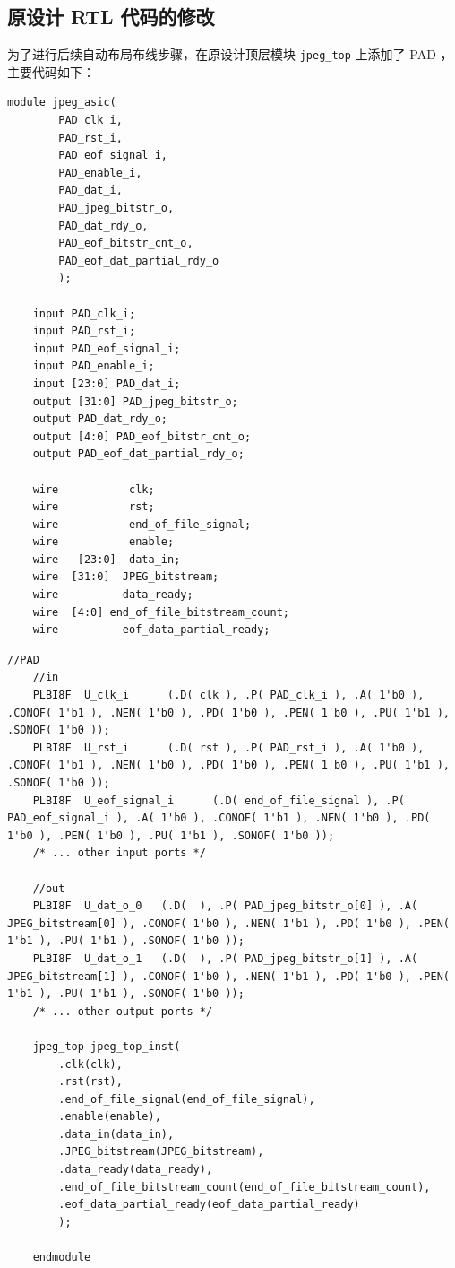 \documentclass[12pt,hyperref,a4paper,UTF8]{ctexart}
\begin{document}
\subsection{原设计 RTL 代码的修改}
为了进行后续自动布局布线步骤，在原设计顶层模块 \texttt{jpeg\_top} 上添加了 PAD ，
主要代码如下：
\begin{lstlisting}[style=Verilogstyle,name=jpeg_asic]
    module jpeg_asic(
        PAD_clk_i, 
        PAD_rst_i, 
        PAD_eof_signal_i, 
        PAD_enable_i, 
        PAD_dat_i, 
        PAD_jpeg_bitstr_o, 
        PAD_dat_rdy_o, 
        PAD_eof_bitstr_cnt_o, 
        PAD_eof_dat_partial_rdy_o
        );
    
    input PAD_clk_i;
    input PAD_rst_i;
    input PAD_eof_signal_i;
    input PAD_enable_i;
    input [23:0] PAD_dat_i;
    output [31:0] PAD_jpeg_bitstr_o;
    output PAD_dat_rdy_o;
    output [4:0] PAD_eof_bitstr_cnt_o;
    output PAD_eof_dat_partial_rdy_o;
    
    wire           clk;
    wire           rst;
    wire           end_of_file_signal;
    wire           enable;
    wire   [23:0]  data_in;
    wire  [31:0]  JPEG_bitstream;
    wire          data_ready;
    wire  [4:0] end_of_file_bitstream_count;
    wire          eof_data_partial_ready;
\end{lstlisting}
\newpage
\begin{lstlisting}[style=Verilogstyle,name=jpeg_asic]
    //PAD
    //in
    PLBI8F  U_clk_i      (.D( clk ), .P( PAD_clk_i ), .A( 1'b0 ), .CONOF( 1'b1 ), .NEN( 1'b0 ), .PD( 1'b0 ), .PEN( 1'b0 ), .PU( 1'b1 ), .SONOF( 1'b0 ));
    PLBI8F  U_rst_i      (.D( rst ), .P( PAD_rst_i ), .A( 1'b0 ), .CONOF( 1'b1 ), .NEN( 1'b0 ), .PD( 1'b0 ), .PEN( 1'b0 ), .PU( 1'b1 ), .SONOF( 1'b0 ));
    PLBI8F  U_eof_signal_i      (.D( end_of_file_signal ), .P( PAD_eof_signal_i ), .A( 1'b0 ), .CONOF( 1'b1 ), .NEN( 1'b0 ), .PD( 1'b0 ), .PEN( 1'b0 ), .PU( 1'b1 ), .SONOF( 1'b0 ));
    /* ... other input ports */

    //out
    PLBI8F	U_dat_o_0	(.D(  ), .P( PAD_jpeg_bitstr_o[0] ), .A( JPEG_bitstream[0] ), .CONOF( 1'b0 ), .NEN( 1'b1 ), .PD( 1'b0 ), .PEN( 1'b1 ), .PU( 1'b1 ), .SONOF( 1'b0 )); 
    PLBI8F	U_dat_o_1	(.D(  ), .P( PAD_jpeg_bitstr_o[1] ), .A( JPEG_bitstream[1] ), .CONOF( 1'b0 ), .NEN( 1'b1 ), .PD( 1'b0 ), .PEN( 1'b1 ), .PU( 1'b1 ), .SONOF( 1'b0 )); 
    /* ... other output ports */
    
    jpeg_top jpeg_top_inst(
        .clk(clk), 
        .rst(rst), 
        .end_of_file_signal(end_of_file_signal), 
        .enable(enable), 
        .data_in(data_in), 
        .JPEG_bitstream(JPEG_bitstream),
        .data_ready(data_ready), 
        .end_of_file_bitstream_count(end_of_file_bitstream_count), 
        .eof_data_partial_ready(eof_data_partial_ready)
        );
    
    endmodule
\end{lstlisting}
\end{document}
